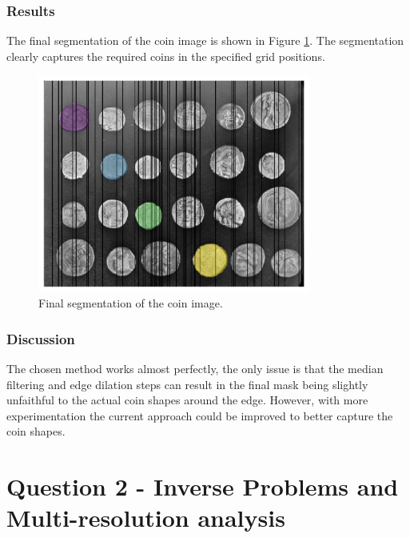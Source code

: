 \documentclass[11pt]{article}
\begin{document}
\subsubsection{Results}
The final segmentation of the coin image is shown in Figure \ref{fig:q1c_selected_coins}. The segmentation clearly captures the required coins in the specified grid positions.  

\begin{figure}[H]
    \centering
    \includegraphics[width=0.8\textwidth]{figs/q1c.png}
    \caption{Final segmentation of the coin image.}
    \label{fig:q1c_selected_coins}
\end{figure}

\subsubsection{Discussion}
The chosen method works almost perfectly, the only issue is that the median filtering and edge dilation steps can result in the final mask being slightly unfaithful to the actual coin shapes around the edge. However, with more experimentation the current approach could be improved to better capture the coin shapes.

\section{Question 2 - Inverse Problems and Multi-resolution analysis}
\end{document}
